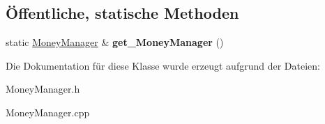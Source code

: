 \subsection*{Öffentliche, statische Methoden}
\begin{DoxyCompactItemize}
\item 
\hypertarget{class_money_manager_a9e244a12805cbff0dee7f76d1ca8c05a}{static \hyperlink{class_money_manager}{Money\-Manager} \& {\bfseries get\-\_\-\-Money\-Manager} ()}\label{class_money_manager_a9e244a12805cbff0dee7f76d1ca8c05a}

\end{DoxyCompactItemize}


Die Dokumentation für diese Klasse wurde erzeugt aufgrund der Dateien\-:\begin{DoxyCompactItemize}
\item 
Money\-Manager.\-h\item 
Money\-Manager.\-cpp\end{DoxyCompactItemize}
